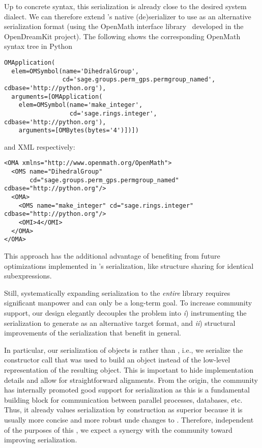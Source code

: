 Up to concrete syntax, this serialization is already close to the desired \Sage system dialect.
We can therefore extend \Python's native (de)serializer to use \OMMT as an alternative serialization format (using the \Python OpenMath interface library~\cite{py-openmath:on} developed in the OpenDreamKit project).
The following shows the corresponding OpenMath syntax tree in Python
\begin{lstlisting}[basicstyle=\sf\small,label=lst:sagedihedral:om,caption={The dihedral group $D_4$ in OpenMath Syntax}]
OMApplication(
  elem=OMSymbol(name='DihedralGroup',
                cd='sage.groups.perm_gps.permgroup_named', cdbase='http://python.org'),
  arguments=[OMApplication(
    elem=OMSymbol(name='make_integer',
                  cd='sage.rings.integer', cdbase='http://python.org'),
    arguments=[OMBytes(bytes='4')])])
\end{lstlisting}
 and XML respectively:
\begin{lstlisting}[basicstyle=\sf\small,label=lst:sagedihedral:xml,caption={The dihedral group $D_4$ in XML Format}]
<OMA xmlns="http://www.openmath.org/OpenMath">
  <OMS name="DihedralGroup"
       cd="sage.groups.perm_gps.permgroup_named" cdbase="http://python.org"/>
  <OMA>
    <OMS name="make_integer" cd="sage.rings.integer" cdbase="http://python.org"/>
    <OMI>4</OMI>
  </OMA>
</OMA>
\end{lstlisting}
This approach has the additional advantage of benefiting from future optimizations implemented in \Python's serialization, like structure sharing for identical subexpressions.




Still, systematically expanding \OMMT serialization to the \emph{entire} \Sage library requires significant manpower and can only be a long-term goal.
To increase community support, our design elegantly decouples the problem into \emph{i}) instrumenting the serialization to generate \OMMT as an alternative target format, and \emph{ii}) structural improvements of the serialization that benefit \Sage in general.

In particular, our serialization of \Sage objects is  rather than , i.e., we serialize the constructor call that was used to build an object instead of the low-level \Python representation of the resulting object.
This is important to hide implementation details and allow for straightforward alignments.
From the origin, the \Sage community has internally promoted good support for serialization as this is a fundamental building block for communication between parallel processes, databases, etc.
Thus, it already values serialization by construction as superior because it is usually more concise and more robust unde changes to \Sage.
Therefore, independent of the purposes of this \papertype, we expect a synergy with the \Sage community toward improving
serialization.

